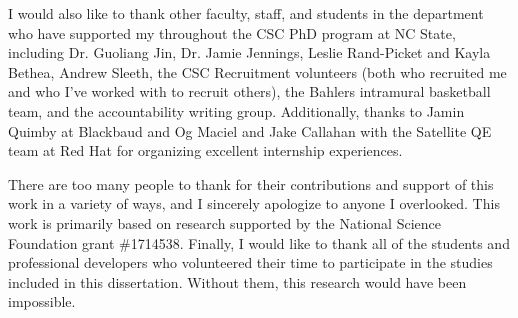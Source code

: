 \begin{acknowledgements}
I would also like to thank other faculty, staff, and students in the department who have supported my throughout the CSC PhD program at NC State, including Dr. Guoliang Jin, Dr. Jamie Jennings, Leslie Rand-Picket and Kayla Bethea, Andrew Sleeth, the CSC Recruitment volunteers (both who recruited me and who I've worked with to recruit others), the Bahlers intramural basketball team, and the accountability writing group. Additionally, thanks to Jamin Quimby at Blackbaud and Og Maciel and Jake Callahan with the Satellite QE team at Red Hat for organizing excellent internship experiences.


There are too many people to thank for their contributions and support of this work in a variety of ways, and I sincerely apologize to anyone I overlooked. This work is primarily based on research supported by the National Science Foundation grant \#1714538. Finally, I would like to thank all of the students and professional developers who volunteered their time to participate in the studies included in this dissertation. Without them, this research would have been impossible.
 
\end{acknowledgements}


\thesistableofcontents

\thesislistoftables

\thesislistoffigures
